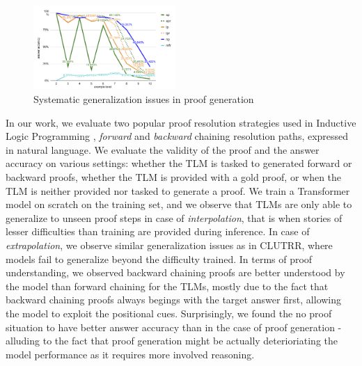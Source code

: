 \documentclass[12pt]{article}
\begin{document}
\begin{figure}
\vspace{-20pt}
\begin{center}
  \includegraphics[width=0.48\textwidth]{images/proof_sys_gen.pdf}
\end{center}
\caption{Systematic generalization issues in proof generation}
\label{fig:proof_sys_gen}
\vspace{-10pt}
\end{figure}

In our work, we evaluate two popular proof resolution strategies used in Inductive Logic Programming \cite{Evans2017-pu} , \textit{forward} and \textit{backward} chaining resolution paths, expressed in natural language. We evaluate the validity of the proof and the answer accuracy on various settings: whether the TLM is tasked to generated forward or backward proofs, whether the TLM is provided with a gold proof, or when the TLM is neither provided nor tasked to generate a proof. We train a Transformer \cite{vaswani2017attention} model on scratch on the training set, and we observe that TLMs are only able to generalize to unseen proof steps in case of \textit{interpolation}, that is when stories of lesser difficulties than training are provided during inference. In case of \textit{extrapolation}, we observe similar generalization issues as in CLUTRR, where models fail to generalize beyond the difficulty trained. In terms of proof understanding, we observed backward chaining proofs are better understood by the model than forward chaining for the TLMs, mostly due to the fact that backward chaining proofs always begings with the target answer first, allowing the model to exploit the positional cues. Surprisingly, we found the no proof situation to have better answer accuracy than in the case of proof generation - alluding to the fact that proof generation might be actually deterioriating the model performance as it requires more involved reasoning.
\end{document}
